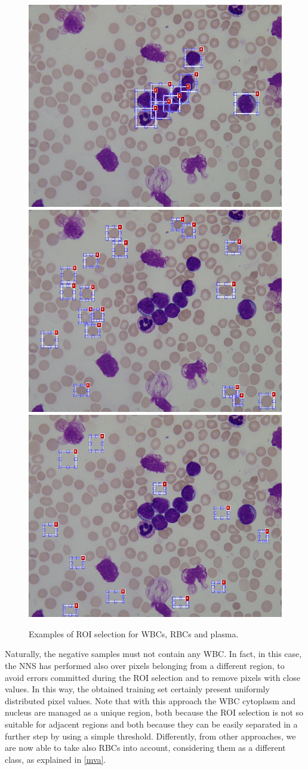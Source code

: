 {	\begin{figure}[h]
		\centering
		\includegraphics[height=0.25\textwidth]{images/2015_1_caip/ROI1}
		\includegraphics[height=0.25\textwidth]{images/2015_1_caip/ROI2}
		\includegraphics[height=0.25\textwidth]{images/2015_1_caip/ROI3}
		\caption[ROI selection.]{\label{fig:ex6}Examples of ROI selection for WBCs, RBCs and plasma.}
	\end{figure}
	
	Naturally, the negative samples must not contain any WBC. In fact, in this case, the NNS has performed also over pixels belonging from a different region, to avoid errors committed during the ROI selection and to remove pixels with close values. In this way, the obtained training set certainly present uniformly distributed pixel values. Note that with this approach the WBC cytoplasm and nucleus are managed as a unique region, both because the ROI selection is not so suitable for adjacent regions and both because they can be easily separated in a further step by using a simple threshold. Differently, from other approaches, we are now able to take also RBCs into account, considering them as a different class, as explained in \ref{mva}.
	
}
